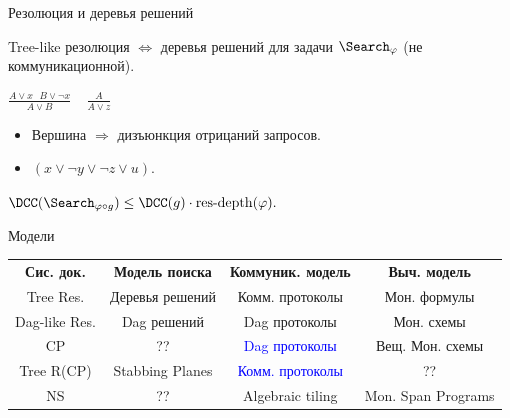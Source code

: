 \begin{frame}{Резолюция и деревья решений}

    \begin{lemma}
        Tree-like резолюция $\Leftrightarrow$ деревья решений для задачи $\Search_{\varphi}$ (не
        коммуникационной).
    \end{lemma}
    \pause

    \begin{minipage}{0.58\linewidth}
        \centering
        
    \end{minipage}
    \pause
    \begin{minipage}{0.4\linewidth}
        \centering
        $\frac{A \lor x ~~~ B \lor \neg x}{A \lor B} ~~~~~ \frac{A}{A \lor z}$
        \begin{itemize}
            \item Вершина $\Rightarrow$ дизъюнкция отрицаний запросов.
            \item $(x \lor \neg y \lor \neg z \lor u)$.
        \end{itemize}
    \end{minipage}

    \pause
    $\DCC(\Search_{\varphi \circ g}) \le \DCC(g) \cdot \mathrm{res\text{-}depth}(\varphi).$
\end{frame}


\begin{frame}{Модели}
    \setlength{\extrarowheight}{0.4cm}
        \begin{tabular}{c c c c}
          \textbf{Сис. док.} & \textbf{Модель поиска} & \textbf{Коммуник. модель} & \textbf{Выч. модель}
          \\
          \pause
          Tree Res. & Деревья решений & Комм. протоколы & Мон. формулы \\
          \pause
          Dag-like Res. & Dag решений & Dag протоколы & Мон. схемы \\
          \pause
          CP & ?? & \textcolor{blue}{Dag протоколы} & Вещ. Мон. схемы \\
          \pause
          Tree R(CP) & Stabbing Planes & \textcolor{blue}{Комм. протоколы}  & ?? \\
          \pause
          NS & ?? & Algebraic tiling & Mon. Span Programs \\
        \end{tabular}
    
\end{frame}

